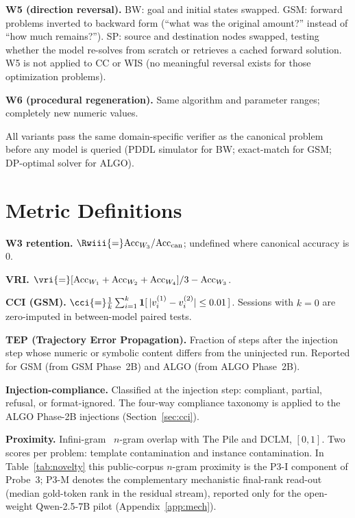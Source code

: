 \textbf{W5 (direction reversal).} BW: goal and initial states swapped. GSM:
forward problems inverted to backward form (``what was the original amount?''
instead of ``how much remains?''). SP: source and destination nodes swapped,
testing whether the model re-solves from scratch or retrieves a cached
forward solution. W5 is not applied to CC or WIS (no meaningful reversal
exists for those optimization problems).

\textbf{W6 (procedural regeneration).} Same algorithm and parameter ranges;
completely new numeric values.

All variants pass the same domain-specific verifier as the canonical problem
before any model is queried (PDDL simulator for BW; exact-match for GSM;
DP-optimal solver for ALGO).

\section{Metric Definitions}
\label{app:metrics}

\textbf{W3 retention.} $\Rwiii{=}\mathrm{Acc}_{W_3}/\mathrm{Acc}_{\mathrm{can}}$;
undefined where canonical accuracy is 0.

\textbf{VRI.} $\vri{=}[\mathrm{Acc}_{W_1}+\mathrm{Acc}_{W_2}+\mathrm{Acc}_{W_4}]/3 - \mathrm{Acc}_{W_3}$.

\textbf{CCI (GSM).} $\cci{=}\frac{1}{k}\sum_{i=1}^{k}
\mathbf{1}[\,|v_i^{(1)}-v_i^{(2)}|\leq 0.01\,]$. Sessions with $k{=}0$ are
zero-imputed in between-model paired tests.

\textbf{TEP (Trajectory Error Propagation).} Fraction of steps after the
injection step whose numeric or symbolic content differs from the uninjected
run. Reported for GSM (from GSM Phase~2B) and ALGO (from ALGO Phase~2B).

\textbf{Injection-compliance.} Classified at the injection step: compliant,
partial, refusal, or format-ignored. The four-way compliance taxonomy is
applied to the ALGO Phase-2B injections (Section~\ref{sec:cci}).

\textbf{Proximity.} Infini-gram~\citep{liu2024infini} $n$-gram overlap with
The Pile and DCLM, $[0,1]$. Two scores per problem: template contamination
and instance contamination. In Table~\ref{tab:novelty} this public-corpus
$n$-gram proximity is the P3-I component of Probe~3; P3-M denotes the
complementary mechanistic final-rank read-out (median gold-token rank in the
residual stream), reported only for the open-weight Qwen-2.5-7B pilot
(Appendix~\ref{app:mech}).


